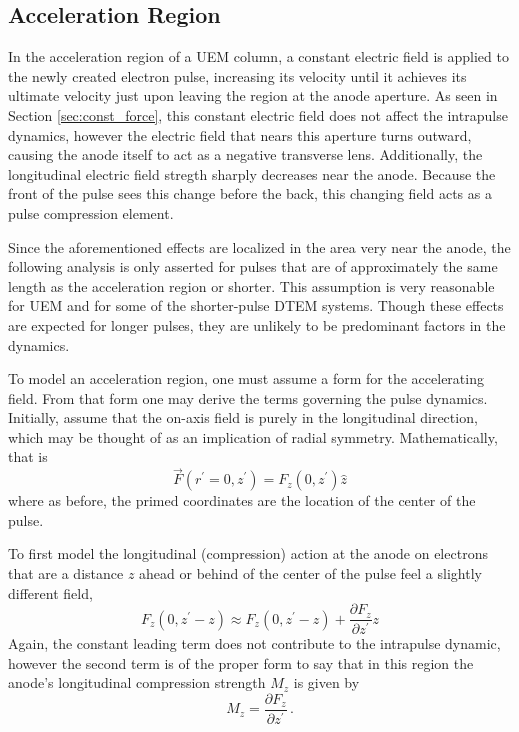 \subsection{Acceleration Region} \label{sec:gun_model}

In the acceleration region of a UEM column, a constant electric field is applied to the newly created electron pulse, increasing its velocity until it achieves its ultimate velocity just upon leaving the region at the anode aperture.
As seen in Section \ref{sec:const_force}, this constant electric field does not affect the intrapulse dynamics, however the electric field that nears this aperture turns outward, causing the anode itself to act as a negative transverse lens. %
Additionally, the longitudinal electric field stregth sharply decreases near the anode.
Because the front of the pulse sees this change before the back, this changing field acts as a pulse compression element.

Since the aforementioned effects are localized in the area very near the anode, the following analysis is only asserted for pulses that are of approximately the same length as the acceleration region or shorter.
This assumption is very reasonable for UEM and for some of the shorter-pulse DTEM systems.
Though these effects are expected for longer pulses, they are unlikely to be predominant factors in the dynamics.

To model an acceleration region, one must assume a form for the accelerating field.
From that form one may derive the terms governing the pulse dynamics. Initially, assume that the on-axis field is purely in the longitudinal direction, which may be thought of as an implication of radial symmetry.
Mathematically, that is
\begin{equation}
  \vec{F}(r^{\prime}=0,z^{\prime}) = F_z (0,z^{\prime}) \hat{z}
\end{equation}
where as before, the primed coordinates are the location of the center of the pulse.

To first model the longitudinal (compression) action at the anode %
on electrons that are a distance $z$ ahead or behind of the center of the pulse feel a slightly different field, 
\begin{equation}
  F_z(0,z^{\prime} - z) \approx F_z(0,z^{\prime} - z) + \frac{\partial F_z}{\partial z^{\prime}} z
\end{equation}
Again, the constant leading term does not contribute to the intrapulse dynamic, however the second term is of the proper form to say that in this region the anode's longitudinal compression strength $M_z$ is given by
\begin{equation}
  M_z = \frac{\partial F_z}{\partial z^{\prime}} \, \text{.}
\end{equation}

